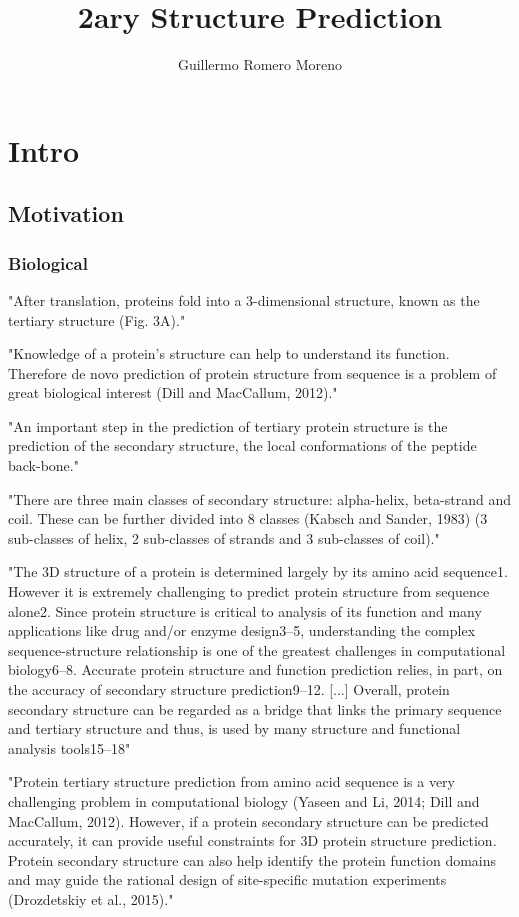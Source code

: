 \documentclass[]{scrartcl}
\title{2ary Structure Prediction}
\author{Guillermo Romero Moreno}
\begin{document}
\maketitle

\tableofcontents

\section{Intro}
\subsection{Motivation}
\subsubsection{Biological}
"After translation, proteins fold into a 3-dimensional structure, known as the tertiary structure (Fig. 3A)."\cite{Jurtz2017}

"Knowledge of a protein’s structure can help to understand its function. Therefore de novo prediction of protein structure from sequence is a problem of great biological interest (Dill and MacCallum, 2012)." \cite{Jurtz2017}

"An important step in the prediction of tertiary protein structure is the prediction of the secondary structure, the local conformations of the peptide back-bone." \cite{Jurtz2017}

"There are three main classes of secondary structure: alpha-helix, beta-strand and coil. These can be further divided into 8 classes (Kabsch and Sander, 1983) (3 sub-classes of helix, 2 sub-classes of strands and 3 sub-classes of coil)." \cite{Jurtz2017}

"The 3D structure of a protein is determined largely by its amino acid sequence1. However it is extremely challenging to predict protein structure from sequence alone2. Since protein structure is critical to analysis of its function and many applications like drug and/or enzyme design3–5, understanding the complex sequence-structure relationship is one of the greatest challenges in computational biology6–8. Accurate protein structure and function prediction relies, in part, on the accuracy of secondary structure prediction9–12. [...] Overall, protein secondary structure can be regarded as a bridge that links the primary sequence and tertiary structure and thus, is used by many structure and functional analysis tools15–18" \cite{Wang2016}

"Protein tertiary structure prediction from amino acid sequence is a very challenging problem in computational biology (Yaseen and Li, 2014; Dill and MacCallum, 2012). However, if a protein secondary structure can be predicted accurately, it can provide useful constraints for 3D protein structure prediction. Protein secondary structure can also help identify the protein function domains and may guide the rational design of site-specific mutation experiments (Drozdetskiy et al., 2015)." \cite{Fang2017}
\end{document}
